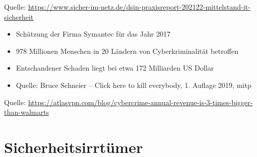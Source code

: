 \begin{frame}

\scriptsize Quelle: \href{https://www.sicher-im-netz.de/dsin-praxisreport-202122-mittelstand-it-sicherheit}{\url{https://www.sicher-im-netz.de/dsin-praxisreport-202122-mittelstand-it-sicherheit}}
\end{frame}


\begin{frame}
\begin{itemize}
  \item Schätzung der Firma Symantec für das Jahr 2017
  \item 978 Millionen Menschen in 20 Ländern von Cyberkriminalität betroffen
  \item Entschandener Schaden liegt bei etwa 172 Milliarden US Dollar
  \item Quelle: Bruce Schneier -- Click here to kill everybody, 1. Auflage 2019, mitp
\end{itemize}
\end{frame}


\begin{frame}
\begin{center}


\scriptsize Quelle: \href{https://atlasvpn.com/blog/cybercrime-annual-revenue-is-3-times-bigger-than-walmarts}{https://atlasvpn.com/blog/cybercrime-annual-revenue-is-3-times-bigger-than-walmarts}
\end{center}
\end{frame}

\section{Sicherheitsirrtümer}

